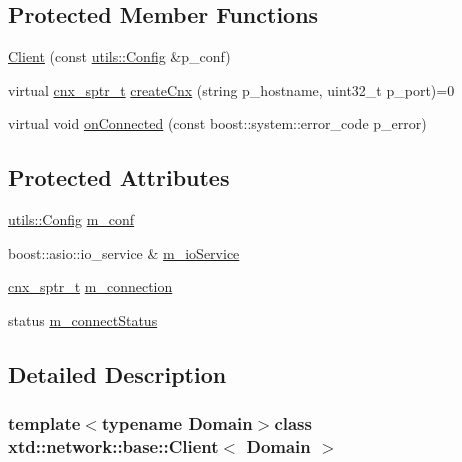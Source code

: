 \subsection*{Protected Member Functions}
\begin{DoxyCompactItemize}
\item 
\hyperlink{classxtd_1_1network_1_1base_1_1Client_a7afc6ed48caf877014df0a3128d6ed05}{Client} (const \hyperlink{classxtd_1_1network_1_1utils_1_1Config}{utils\-::\-Config} \&p\-\_\-conf)
\item 
virtual \hyperlink{classxtd_1_1network_1_1base_1_1Client_a3cef8310676dac754d630bcc1628ab56}{cnx\-\_\-sptr\-\_\-t} \hyperlink{classxtd_1_1network_1_1base_1_1Client_ad7964979939106d0c496c4f78a834b0d}{create\-Cnx} (string p\-\_\-hostname, uint32\-\_\-t p\-\_\-port)=0
\item 
virtual void \hyperlink{classxtd_1_1network_1_1base_1_1Client_a05ea029f4bfed5d9581ebc606e198336}{on\-Connected} (const boost\-::system\-::error\-\_\-code p\-\_\-error)
\end{DoxyCompactItemize}
\subsection*{Protected Attributes}
\begin{DoxyCompactItemize}
\item 
\hyperlink{classxtd_1_1network_1_1utils_1_1Config}{utils\-::\-Config} \hyperlink{classxtd_1_1network_1_1base_1_1Client_addb0f7fb40585d3db038b16f11e466cd}{m\-\_\-conf}
\item 
boost\-::asio\-::io\-\_\-service \& \hyperlink{classxtd_1_1network_1_1base_1_1Client_ae3945e4771a207872ab45b73de2e040f}{m\-\_\-io\-Service}
\item 
\hyperlink{classxtd_1_1network_1_1base_1_1Client_a3cef8310676dac754d630bcc1628ab56}{cnx\-\_\-sptr\-\_\-t} \hyperlink{classxtd_1_1network_1_1base_1_1Client_a9293a756af76e066790a1f389dbedb77}{m\-\_\-connection}
\item 
status \hyperlink{classxtd_1_1network_1_1base_1_1Client_a99e6d675c7617cd6d8e94793d8af4871}{m\-\_\-connect\-Status}
\end{DoxyCompactItemize}


\subsection{Detailed Description}
\subsubsection*{template$<$typename Domain$>$class xtd\-::network\-::base\-::\-Client$<$ Domain $>$}

